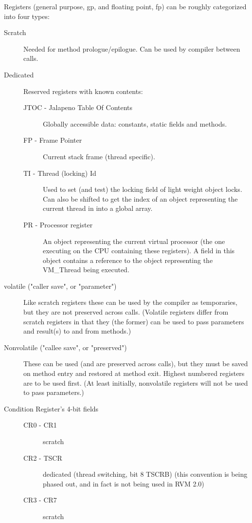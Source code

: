 Registers (general purpose, gp, and floating point, fp) can be roughly
categorized into four types:

\begin{description}
\item [Scratch]
     Needed for method prologue/epilogue.  Can be used by compiler between
     calls.

\item[Dedicated]
     Reserved registers with known contents:
\begin{description}
\item [JTOC - Jalapeno Table Of Contents]
        Globally accessible data: constants, static fields and methods.

\item [FP - Frame Pointer]
        Current stack frame (thread specific).

\item [TI - Thread (locking) Id]
        Used to set (and test) the locking field of light weight object
        locks.  Can also be shifted to get the index of an object
        representing the current thread in into a global array.

\item [PR - Processor register]
        An object representing the current virtual processor (the one
        executing on the CPU containing these registers).  A field in
        this object contains a reference to the object representing
        the VM\_Thread being executed.
\end{description}

\item [volatile ("caller save", or "parameter")]
     Like scratch registers these can be used by the compiler as
     temporaries, but they are not preserved across calls.  (Volatile
     registers differ from scratch registers in that they (the former)
     can be used to pass parameters and result(s) to and from
     methods.)

\item [Nonvolatile ("callee save", or "preserved")]
     These can be used (and are preserved across calls), but they must be
     saved on method entry and restored at method exit.  Highest numbered
     registers are to be used first.  (At least initially, nonvolatile
     registers will not be used to pass parameters.)

\item[Condition Register's 4-bit fields]
\begin{description}
\item    [CR0 - CR1] scratch

\item    [CR2 - TSCR] dedicated (thread switching, bit 8 TSCRB) (this
     convention is being phased out, and in fact is not being used in RVM 2.0)

\item    [CR3 - CR7] scratch
\end{description}
\end{description}


